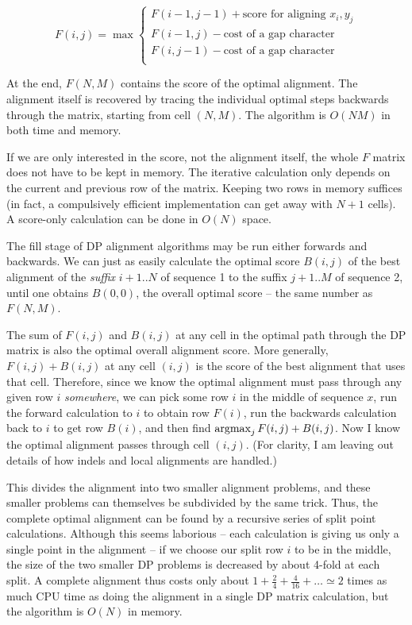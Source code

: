 \documentclass[11pt]{article}
\def\argmax{\mathop{\mathrm{argmax}}\limits}
\begin{document}
\[  F(i,j) = \max \left\{ \begin{array}{l}
                       F(i-1,j-1) + \mbox{score for aligning $x_i, y_j$} \\
                       F(i-1,j) - \mbox{cost of a gap character} \\
                       F(i,j-1) - \mbox{cost of a gap character} \\
                       \end{array} \right. \]

At the end, $F(N,M)$ contains the score of the optimal alignment. The
alignment itself is recovered by tracing the individual optimal steps
backwards through the matrix, starting from cell $(N,M)$. The
algorithm is $O(NM)$ in both time and memory.

If we are only interested in the score, not the alignment itself, the
whole $F$ matrix does not have to be kept in memory. The iterative
calculation only depends on the current and previous row of the
matrix. Keeping two rows in memory suffices (in fact, a compulsively
efficient implementation can get away with $N+1$ cells). A score-only
calculation can be done in $O(N)$ space.

The fill stage of DP alignment algorithms may be run either forwards
and backwards. We can just as easily calculate the optimal score
$B(i,j)$ of the best alignment of the \emph{suffix} $i+1..N$ of
sequence 1 to the suffix $j+1..M$ of sequence 2, until one obtains
$B(0,0)$, the overall optimal score -- the same number as $F(N,M)$.

The sum of $F(i,j)$ and $B(i,j)$ at any cell in the optimal path
through the DP matrix is also the optimal overall alignment score.
More generally, $F(i,j) + B(i,j)$ at any cell $(i,j)$ is the score of
the best alignment that uses that cell. Therefore, since we know the
optimal alignment must pass through any given row $i$
\emph{somewhere}, we can pick some row $i$ in the middle of sequence
$x$, run the forward calculation to $i$ to obtain row $F(i)$, run the
backwards calculation back to $i$ to get row $B(i)$, and then find
$\argmax\nolimits_j F(i,j) + B(i,j)$. Now I know the optimal alignment
passes through cell $(i,j)$. (For clarity, I am leaving out details of
how indels and local alignments are handled.)

This divides the alignment into two smaller alignment problems, and
these smaller problems can themselves be subdivided by the same trick.
Thus, the complete optimal alignment can be found by a recursive
series of split point calculations. Although this seems laborious --
each calculation is giving us only a single point in the alignment --
if we choose our split row $i$ to be in the middle, the size of the
two smaller DP problems is decreased by about 4-fold at each split. A
complete alignment thus costs only about $1 + \frac{2}{4} +
\frac{4}{16} + \ldots \simeq 2$ times as much CPU time as doing the
alignment in a single DP matrix calculation, but the algorithm is
$O(N)$ in memory.
\end{document}
